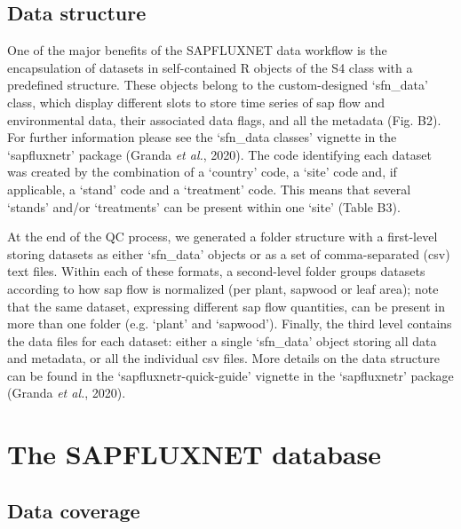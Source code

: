 \documentclass[11pt,twoside]{reedthesis}
\begin{document}
\subsection{Data structure}\label{data-structure}

One of the major benefits of the SAPFLUXNET data workflow is the
encapsulation of datasets in self-contained R objects of the S4 class
with a predefined structure. These objects belong to the custom-designed
`sfn\_data' class, which display different slots to store time series of
sap flow and environmental data, their associated data flags, and all
the metadata (Fig. B2). For further information please see the
`sfn\_data classes' vignette in the `sapfluxnetr' package (Granda
\emph{et al.}, 2020). The code identifying each dataset was created by
the combination of a `country' code, a `site' code and, if applicable, a
`stand' code and a `treatment' code. This means that several `stands'
and/or `treatments' can be present within one `site' (Table B3).\par

At the end of the QC process, we generated a folder structure with a
first-level storing datasets as either `sfn\_data' objects or as a set
of comma-separated (csv) text files. Within each of these formats, a
second-level folder groups datasets according to how sap flow is
normalized (per plant, sapwood or leaf area); note that the same
dataset, expressing different sap flow quantities, can be present in
more than one folder (e.g. `plant' and `sapwood'). Finally, the third
level contains the data files for each dataset: either a single
`sfn\_data' object storing all data and metadata, or all the individual
csv files. More details on the data structure can be found in the
`sapfluxnetr-quick-guide' vignette in the `sapfluxnetr' package (Granda
\emph{et al.}, 2020).\par

\section{The SAPFLUXNET database}\label{the-sapfluxnet-database}

\subsection{Data coverage}\label{data-coverage}
\end{document}
